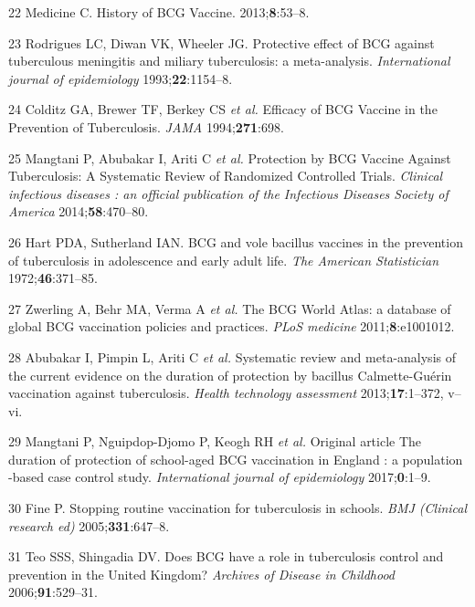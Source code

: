\documentclass[11pt,twoside]{bristolthesis}
\begin{document}
  \leavevmode\hypertarget{ref-Medicine2013}{}%
  22 Medicine C. History of BCG Vaccine. 2013;\textbf{8}:53--8.
  
  \leavevmode\hypertarget{ref-Rodrigues1993}{}%
  23 Rodrigues LC, Diwan VK, Wheeler JG. Protective effect of BCG against tuberculous meningitis and miliary tuberculosis: a meta-analysis. \emph{International journal of epidemiology} 1993;\textbf{22}:1154--8.
  
  \leavevmode\hypertarget{ref-Colditz1994}{}%
  24 Colditz GA, Brewer TF, Berkey CS \emph{et al.} Efficacy of BCG Vaccine in the Prevention of Tuberculosis. \emph{JAMA} 1994;\textbf{271}:698.
  
  \leavevmode\hypertarget{ref-Mangtani2014a}{}%
  25 Mangtani P, Abubakar I, Ariti C \emph{et al.} Protection by BCG Vaccine Against Tuberculosis: A Systematic Review of Randomized Controlled Trials. \emph{Clinical infectious diseases : an official publication of the Infectious Diseases Society of America} 2014;\textbf{58}:470--80.
  
  \leavevmode\hypertarget{ref-Hart1972}{}%
  26 Hart PDA, Sutherland IAN. BCG and vole bacillus vaccines in the prevention of tuberculosis in adolescence and early adult life. \emph{The American Statistician} 1972;\textbf{46}:371--85.
  
  \leavevmode\hypertarget{ref-Zwerling2011}{}%
  27 Zwerling A, Behr MA, Verma A \emph{et al.} The BCG World Atlas: a database of global BCG vaccination policies and practices. \emph{PLoS medicine} 2011;\textbf{8}:e1001012.
  
  \leavevmode\hypertarget{ref-Abubakar2013}{}%
  28 Abubakar I, Pimpin L, Ariti C \emph{et al.} Systematic review and meta-analysis of the current evidence on the duration of protection by bacillus Calmette-Guérin vaccination against tuberculosis. \emph{Health technology assessment} 2013;\textbf{17}:1--372, v--vi.
  
  \leavevmode\hypertarget{ref-Mangtani2017}{}%
  29 Mangtani P, Nguipdop-Djomo P, Keogh RH \emph{et al.} Original article The duration of protection of school-aged BCG vaccination in England : a population -based case control study. \emph{International journal of epidemiology} 2017;\textbf{0}:1--9.
  
  \leavevmode\hypertarget{ref-Fine2005a}{}%
  30 Fine P. Stopping routine vaccination for tuberculosis in schools. \emph{BMJ (Clinical research ed)} 2005;\textbf{331}:647--8.
  
  \leavevmode\hypertarget{ref-Teo2006}{}%
  31 Teo SSS, Shingadia DV. Does BCG have a role in tuberculosis control and prevention in the United Kingdom? \emph{Archives of Disease in Childhood} 2006;\textbf{91}:529--31.
  
\end{document}
